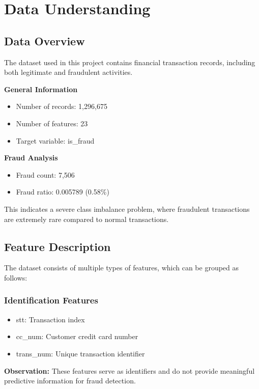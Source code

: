 \newpage

\section{Data Understanding}

\subsection{Data Overview}

The dataset used in this project contains financial transaction records, including both legitimate and fraudulent activities.

\textbf{General Information}
\begin{itemize}
    \item Number of records: 1,296,675
    \item Number of features: 23
    \item Target variable: is\_fraud
\end{itemize}

\textbf{Fraud Analysis}
\begin{itemize}
    \item Fraud count: 7,506
    \item Fraud ratio: 0.005789 (0.58\%)
\end{itemize}

This indicates a severe class imbalance problem, where fraudulent transactions are extremely rare compared to normal transactions.

\subsection{Feature Description}

The dataset consists of multiple types of features, which can be grouped as follows:

\subsubsection{Identification Features}
\begin{itemize}
    \item stt: Transaction index
    \item cc\_num: Customer credit card number
    \item trans\_num: Unique transaction identifier
\end{itemize}

\textbf{Observation:} These features serve as identifiers and do not provide meaningful predictive information for fraud detection.

